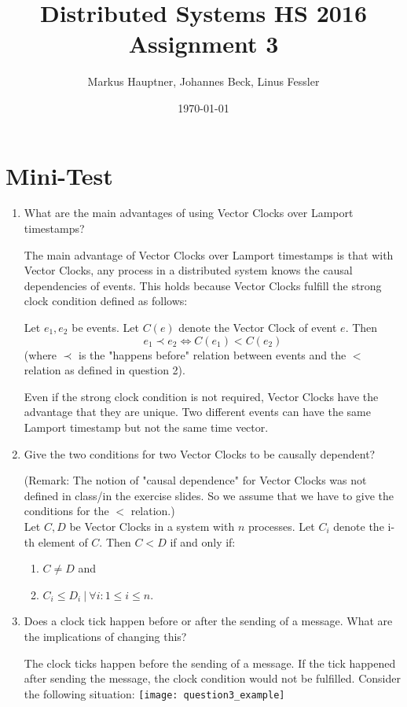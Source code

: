 \documentclass[11pt]{article}
\title{Distributed Systems HS 2016\\Assignment 3}
\author{Markus Hauptner, Johannes Beck, Linus Fessler}
\date{\today}
\begin{document}
\maketitle

\section{Mini-Test}

\begin{enumerate}

\item {What are the main advantages of using Vector Clocks over Lamport timestamps?}
 
The main advantage of Vector Clocks over Lamport timestamps is that with Vector Clocks, any process in a distributed system knows the causal dependencies of events. This holds because Vector Clocks fulfill the strong clock condition defined as follows:

Let $e_1,e_2$ be events. Let $C(e)$ denote the Vector Clock of event $e$. Then $$e_1 \prec e_2 \Longleftrightarrow C(e_1) < C(e_2)$$ (where $\prec$ is the "happens before" relation between events and the $<$ relation as defined in question 2).

Even if the strong clock condition is not required, Vector Clocks have the advantage that they are unique. Two different events can have the same Lamport timestamp but not the same time vector.

\item {Give the two conditions for two Vector Clocks to be causally dependent?}

(Remark: The notion of "causal dependence" for Vector Clocks was not defined in class/in the exercise slides. So we assume that we have to give the conditions for the $<$ relation.)\\
Let $C,D$ be Vector Clocks in a system with $n$ processes. Let $C_i$ denote the i-th element of $C$. Then $C < D$ if and only if:
\begin{enumerate}
\item $C \not= D$ and
\item $C_i \le D_i ~|~\forall i : 1 \le i \le n$.
\end{enumerate}


\item {Does a clock tick happen before or after the sending of a message. What are the implications of changing this?}

The clock ticks happen before the sending of a message. If the tick happened after sending the message, the clock condition would not be fulfilled. Consider the following situation: \texttt{[image: question3\_example]}


\end{enumerate}
\end{document}

